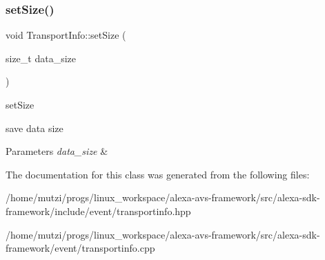 \subsubsection{\texorpdfstring{set\+Size()}{setSize()}}
{\footnotesize\ttfamily void Transport\+Info\+::set\+Size (\begin{DoxyParamCaption}\item[{size\+\_\+t}]{data\+\_\+size }\end{DoxyParamCaption})}



set\+Size 

save data size 
\begin{DoxyParams}{Parameters}
{\em data\+\_\+size} & \\
\hline
\end{DoxyParams}


The documentation for this class was generated from the following files\+:\begin{DoxyCompactItemize}
\item 
/home/mutzi/progs/linux\+\_\+workspace/alexa-\/avs-\/framework/src/alexa-\/sdk-\/framework/include/event/transportinfo.\+hpp\item 
/home/mutzi/progs/linux\+\_\+workspace/alexa-\/avs-\/framework/src/alexa-\/sdk-\/framework/event/transportinfo.\+cpp\end{DoxyCompactItemize}
